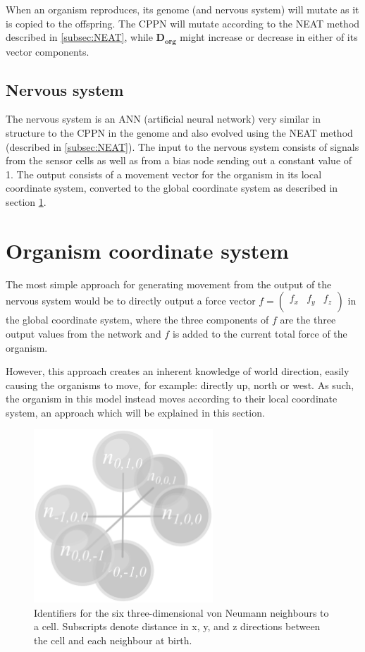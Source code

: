 When an organism reproduces, its genome (and nervous system) will mutate as it is copied to the offspring. The CPPN will mutate according to the NEAT method described in \ref{subsec:NEAT}, while \(\mathbf{D_{org}}\) might increase or decrease in either of its vector components.

\subsection{Nervous system} \label{subsec:nervousSystem}
The nervous system is an ANN (artificial neural network) very similar in structure to the CPPN in the genome and also evolved using the NEAT method (described in \ref{subsec:NEAT}). The input to the nervous system consists of signals from the sensor cells as well as from a bias node sending out a constant value of 1. The output consists of a movement vector for the organism in its local coordinate system, converted to the global coordinate system as described in section \ref{sec:orgCoordSys}.

\section{Organism coordinate system}\label{sec:orgCoordSys}
The most simple approach for generating movement from the output of the nervous system would be to directly output a force vector \(f=\left(\begin{array}{ccc} f_x & f_y & f_z \\\end{array}\right)\) in the global coordinate system, where the three components of \(f\) are the three output values from the network and \(f\) is added to the current total force of the organism.

However, this approach creates an inherent knowledge of world direction, easily causing the organisms to move, for example: directly up, north or west. As such, the organism in this model instead moves according to their local coordinate system, an approach which will be explained in this section.

\begin{figure}
  \centering
  \includegraphics[width=0.6\textwidth]{figure/neighbours}
  \caption{Identifiers for the six three-dimensional von Neumann neighbours to a cell. Subscripts denote distance in x, y, and z directions between the cell and each neighbour at birth.}
  \label{fig:neighbours} 
\end{figure}

